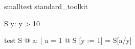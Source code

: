 \begin{zsection}
\SECTION smalltest \parents standard\_toolkit
\end{zsection}

\begin{schema}{S}
   y: \nat
\where
   y > 10
\end{schema}

\begin{theorem}{test}
   \forall S @ \exists a: \nat | a = 1 @ \theta S [y := 1] = \theta S[a/y]
\end{theorem}
